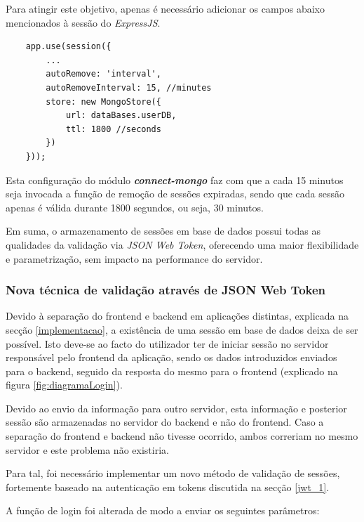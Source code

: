 Para atingir este objetivo, apenas é necessário adicionar os campos abaixo mencionados à sessão do \emph{ExpressJS}.

\vspace{-3mm}
\begin{verbatim}
    app.use(session({
        ...
        autoRemove: 'interval',
        autoRemoveInterval: 15, //minutes
        store: new MongoStore({
            url: dataBases.userDB,
            ttl: 1800 //seconds
        })
    }));
\end{verbatim}
\vspace{-2mm}
Esta configuração do módulo \emph{\textbf{connect-mongo}} faz com que a cada 15 minutos seja invocada a função de remoção de sessões expiradas, sendo que cada sessão apenas é válida durante 1800 segundos, ou seja, 30 minutos.

Em suma, o armazenamento de sessões em base de dados possui todas as qualidades da validação via \emph{JSON Web Token}, oferecendo uma maior flexibilidade e parametrização, sem impacto na performance do servidor.

\subsubsection{Nova técnica de validação através de JSON Web Token} \label{jwt_2}

Devido à separação do frontend e backend em aplicações distintas, explicada na secção \ref{implementacao}, a existência de uma sessão em base de dados deixa de ser possível. Isto deve-se ao facto do utilizador ter de iniciar sessão no servidor responsável pelo frontend da aplicação, sendo os dados introduzidos enviados para o backend, seguido da resposta do mesmo para o frontend (explicado na figura \ref{fig:diagramaLogin}).

Devido ao envio da informação para outro servidor, esta informação e posterior sessão são armazenadas no servidor do backend e não do frontend. Caso a separação do frontend e backend não tivesse ocorrido, ambos correriam no mesmo servidor e este problema não existiria.

Para tal, foi necessário implementar um novo método de validação de sessões, fortemente baseado na autenticação em tokens discutida na secção \ref{jwt_1}.

A função de login foi alterada de modo a enviar os seguintes parâmetros:

